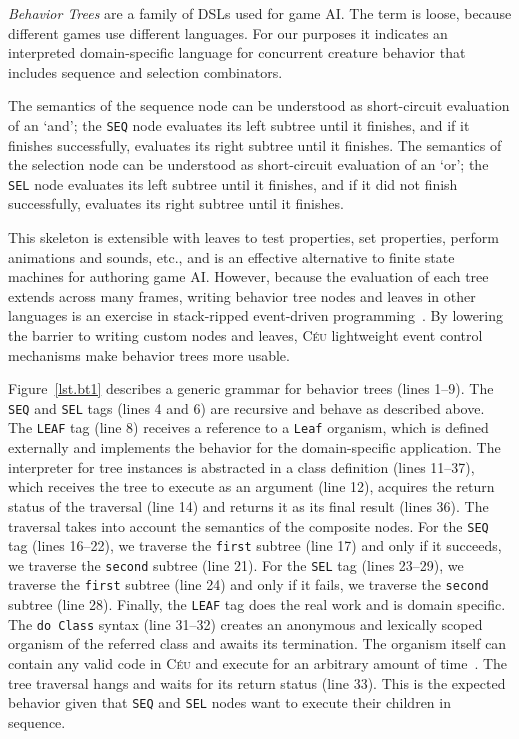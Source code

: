 \documentclass{sig-alternate}
\newcommand{\CEU}{\textsc{C\'{e}u}\xspace}
\newcommand{\code}[1] {{\small{\texttt{#1}}}}
\begin{document}
\emph{Behavior Trees} are a family of DSLs used for game 
AI.
The term is loose, because different games use different languages.
For our purposes it indicates an interpreted domain-specific language
for concurrent creature behavior that includes sequence and selection combinators.

The semantics of the sequence node can be understood as short-circuit evaluation of an `and';
the \code{SEQ} node evaluates its left subtree until it finishes,
and if it finishes successfully, evaluates its right subtree until it finishes.
The semantics of the selection node can be understood as short-circuit evaluation of an `or';
the \code{SEL} node evaluates its left subtree until it finishes,
and if it did not finish successfully, evaluates its right subtree until it finishes.

This skeleton is extensible with leaves to test properties, set properties, 
perform animations and sounds, etc., and is an effective alternative to finite 
state machines for authoring game AI.
%
However, because the evaluation of each tree extends across many frames, 
writing behavior tree nodes and leaves in other languages is an exercise in 
stack-ripped event-driven programming~\cite{krohn2007events}.
%
%
By lowering the barrier to writing custom nodes and leaves, \CEU lightweight 
event control mechanisms make behavior trees more usable.

Figure~\ref{lst.bt1} describes a generic grammar for behavior trees (lines 
1--9).
The \code{SEQ} and \code{SEL} tags (lines 4 and 6) are recursive and behave as 
described above.
The \code{LEAF} tag (line 8) receives a reference to a \code{Leaf} organism, 
which is defined externally and implements the behavior for the domain-specific 
application.
%
The interpreter for tree instances is abstracted in a class definition (lines 
11--37), which receives the tree to execute as an argument (line 12), acquires 
the return status of the traversal (line 14) and returns it as its final result 
(lines 36).
%
The traversal takes into account the semantics of the composite nodes.
%
For the \code{SEQ} tag (lines 16--22), we traverse the \code{first} subtree 
(line 17) and only if it succeeds, we traverse the \code{second} subtree (line 
21).
%
For the \code{SEL} tag (lines 23--29), we traverse the \code{first} subtree 
(line 24) and only if it fails, we traverse the \code{second} subtree (line 
28).
%
Finally, the \code{LEAF} tag does the real work and is domain specific.
The \code{do Class} syntax (line 31--32) creates an anonymous and lexically 
scoped organism of the referred class and awaits its termination.
The organism itself can contain any valid code in \CEU and execute for an 
arbitrary amount of time~\cite{ceu.mod15}.
The tree traversal hangs and waits for its return status (line 33).
This is the expected behavior given that \code{SEQ} and \code{SEL} nodes want 
to execute their children in sequence.
\end{document}
